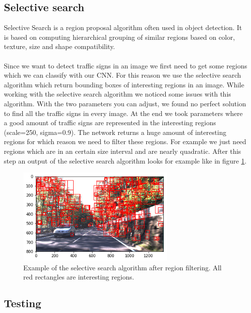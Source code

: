 \documentclass[12pt,a4paper,bibliography=totocnumbered,listof=totocnumbered]{scrartcl}
\begin{document}
\subsection{Selective search}

Selective Search is a region proposal algorithm often used in object detection. It is based on computing hierarchical grouping of similar regions based on color, texture, size and shape compatibility.\\\\

Since we want to detect traffic signs in an image we first need to get some regions which we can classify with our CNN. For this reason we use the selective search algorithm which return bounding boxes of interesting regions in an image. While working with the selective search algorithm we noticed some issues with this algorithm. With the two parameters you can adjust, we found no perfect solution to find all the traffic signs in every image. At the end we took parameters where a good amount of traffic signs are represented in the interesting regions (scale=250, sigma=0.9). The network returns a huge amount of interesting regions for which reason we need to filter these regions. For example we just need regions which are in an certain size interval and are nearly quadratic. After this step an output of the selective search algorithm looks for example like in figure \ref{fig:selective_search_example}.

\begin{figure}[htbp] 
  \centering
     \includegraphics[width=0.7\textwidth]{selective_search_example}
  \caption{Example of the selective search algorithm after region filtering. All red rectangles are interesting regions.}
  \label{fig:selective_search_example}
\end{figure}

\subsection{Testing}
\end{document}
